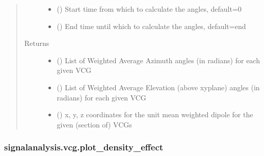 \documentclass[letterpaper,10pt,english]{sphinxmanual}
\begin{document}
\begin{fulllineitems}
\begin{quote}
\begin{description}
\begin{itemize}
\item {} 
\sphinxAtStartPar
{} (\sphinxstyleliteralemphasis{\sphinxupquote{, }}) \textendash{} Start time from which to calculate the angles, default=0

\item {} 
\sphinxAtStartPar
{} (\sphinxstyleliteralemphasis{\sphinxupquote{, }}) \textendash{} End time until which to calculate the angles, default=end

\end{itemize}

\item[{Returns}] \leavevmode
\sphinxAtStartPar
\begin{itemize}
\item {} 
\sphinxAtStartPar
{} () \textendash{} List of Weighted Average Azimuth angles (in radians) for each given VCG

\item {} 
\sphinxAtStartPar
{} () \textendash{} List of Weighted Average Elevation (above xy\sphinxhyphen{}plane) angles (in radians) for each given VCG

\item {} 
\sphinxAtStartPar
{} () \textendash{} x, y, z coordinates for the unit mean weighted dipole for the given (section of) VCGs

\end{itemize}


\end{description}\end{quote}

\end{fulllineitems}



\subsubsection{signalanalysis.vcg.plot\_density\_effect}
\label{\detokenize{_autosummary/signalanalysis.vcg.plot_density_effect:signalanalysis-vcg-plot-density-effect}}\label{\detokenize{_autosummary/signalanalysis.vcg.plot_density_effect::doc}}
\end{document}
